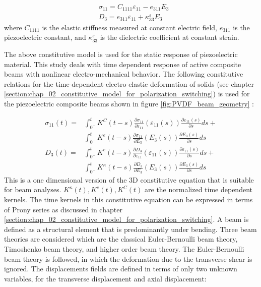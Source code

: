 \begin{equation}
\begin{aligned}
&\sigma_{11}=C_{1111} \varepsilon_{11}-e_{311} E_{3} \\
&D_3=e_{311} \varepsilon_{11}+\kappa_{33}^\varepsilon E_{3}
\end{aligned}
\label{stress_1D_const_eqn_beam:EQN}
\end{equation}
where $C_{1111}$ is the elastic stiffness measured at constant electric field,
$e_{311}$ is the piezoelectric constant, and $\kappa_{33}^\varepsilon$ is the dielectric coefficient at constant strain.

The above constitutive model is used for the static response of piezoelectric material.
This study deals with time dependent response of active composite beams with nonlinear electro-mechanical behavior.
The following constitutive relations for the time-dependent-electro-elastic deformation of solids
 (see chapter \ref{section:chap_02_constitutive_model_for_polarization_switching}) is used for the piezoelectric composite beams shown in figure \ref{fig:PVDF_beam_geometry} :

\begin{equation}
\begin{aligned}
\sigma_{11}(t)=
&\int_{0^-}^t
K^C(t-s)\frac{\partial \sigma_{11}}{\partial\varepsilon_{11}} (\varepsilon_{11}(s))\frac{\partial {\varepsilon}_{11}(s)}  {\partial s} ds +\\
&\int_{0^-}^t
K^e (t-s) \frac{\partial \sigma_{11}}{\partial E_{3}}(E_3(s))  \frac{\partial {E}_{3} (s)}  {\partial s} ds
\\
D_3(t)=
&\int_{0^-}^t
K^{e}(t-s)
\frac{\partial D_{3}}{\partial \varepsilon_{11}}(\varepsilon_{11}(s))
\frac{ \partial {\varepsilon}_{11}(s)}  {\partial s}  ds + \\
&\int_{0^-}^t
K^{\kappa}(t-s) \frac{\partial D_{3}}{\partial E_{3}}(E_3(s))  \frac{\partial {E}_{3} (s)}  {\partial s} ds
\end{aligned}
\label{visco_stress_1D_const_eqn_beam:EQN}
\end{equation}
This is a one dimensional version of the 3D constitutive equation that is suitable for beam analyses.
$K^{\kappa}(t), K^e(t), K^C(t)$ are the normalized time dependent kernels.
The time kernels in this constitutive equation can be expressed in terms of Prony series as discussed in chapter \ref{section:chap_02_constitutive_model_for_polarization_switching}. 
A beam is defined as a structural element that is predominantly under bending. 
Three beam theories are considered which are the classical Euler-Bernoulli beam theory, Timoshenko beam theory, and higher order beam theory.
The Euler-Bernoulli beam theory is followed, in which the deformation due to the transverse shear is ignored.
The displacements fields are defined in terms of only two unknown variables, for the transverse displacement and axial displacement:

